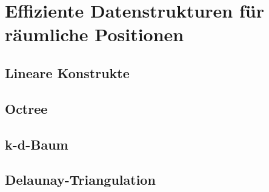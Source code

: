 \section{Effiziente Datenstrukturen für räumliche Positionen}

\subsection{Lineare Konstrukte}

\subsection{Octree}

\subsection{k-d-Baum}

\subsection{Delaunay-Triangulation}
